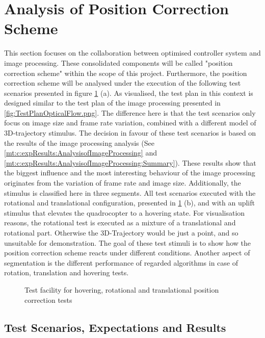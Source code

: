 \section{Analysis of Position Correction Scheme}
\label{mt:c:expResults:AnalysisofPositionCorrectionScheme}
This section focuses on the collaboration between optimised controller system and image processing. These consolidated components will be called 
"position correction scheme" within the scope of this project. Furthermore, the position correction scheme will be analysed under the execution of the following test scenarios presented in figure \ref{fig:PositionCorrectionSchemeTest.pdf} (a). As visualised, the test plan in this context is designed similar to the test plan of the image processing presented in \ref{fig:TestPlanOpticalFlow.png}. The difference here is that the test scenarios only focus on image size and frame rate variation, combined with a different model of 3D-trajectory stimulus. The decision in favour of these test scenarios is based on the results of the image processing analysis (See \ref{mt:c:expResults:AnalysisofImageProcessing} and 
\ref{mt:c:expResults:AnalysisofImageProcessing:Summary}). These results show that the biggest influence and the most interesting behaviour of the image processing originates from the variation of frame rate and image size. Additionally, the stimulus is classified here in three segments. All test scenarios executed with the rotational and translational configuration, presented in 
\ref{fig:PositionCorrectionSchemeTest.pdf} (b), and with an uplift stimulus that elevates the quadrocopter to a hovering state. For visualisation reasons, the rotational test is executed as a mixture of a translational and rotational part. Otherwise the 3D-Trajectory would be just a point, and so unsuitable for demonstration. The goal of these test stimuli is to show how the position correction scheme reacts under different conditions. Another aspect of segmentation is the different performance of regarded algorithms in case of rotation, translation and hovering tests.

\begin{figure}[H]
\hfill
{}
\caption{Test facility for hovering, rotational and translational position correction tests} 
\label{fig:PositionCorrectionSchemeTest.pdf}
\end{figure}


\subsection{Test Scenarios, Expectations and Results}

